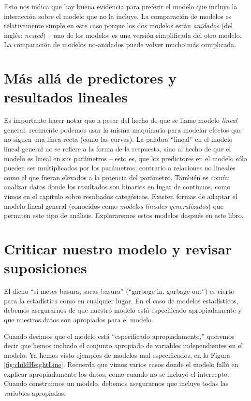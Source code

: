 \documentclass[
  12pt,
]{book}
\theoremstyle{definition}
\theoremstyle{definition}
\theoremstyle{definition}
\theoremstyle{remark}
\begin{document}
Esto nos indica que hay buena evidencia para preferir el modelo que incluye la interacción sobre el modelo que no la incluye. La comparación de modelos es relativamente simple en este caso porque los dos modelos están \emph{anidados} (del inglés: \emph{nested}) -- uno de los modelos es una versión simplificada del otro modelo. La comparación de modelos no-anidados puede volver mucho más complicada.

\hypertarget{muxe1s-alluxe1-de-predictores-y-resultados-lineales}{%
\section{Más allá de predictores y resultados lineales}\label{muxe1s-alluxe1-de-predictores-y-resultados-lineales}}

Es importante hacer notar que a pesar del hecho de que se llame modelo \emph{lineal} general, realmente podemos usar la misma maquinaria para modelar efectos que no siguen una línea recta (como las curvas). La palabra ``lineal'' en el modelo lineal general no se refiere a la forma de la respuesta, sino al hecho de que el modelo es lineal en sus parámetros -- esto es, que los predictores en el modelo sólo pueden ser multiplicados por los parámetros, contrario a relaciones no lineales como el que fueran elevados a la potencia del parámetro. También es común analizar datos donde los resultados son binarios en lugar de continuos, como vimos en el capítulo sobre resultados categóricos. Existen formas de adaptar el modelo lineal general (conocidos como \emph{modelos lineales generalizados}) que permiten este tipo de análisis. Exploraremos estos modelos después en este libro.

\hypertarget{model-criticism}{%
\section{Criticar nuestro modelo y revisar suposiciones}\label{model-criticism}}

El dicho ``si metes basura, sacas basura'' (``garbage in, garbage out'') es cierto para la estadística como en cualquier lugar. En el caso de modelos estadísticos, debemos asegurarnos de que nuestro modelo está especificado apropiadamente y que nuestros datos son apropiados para el modelo.

Cuando decimos que el modelo está ``especificado apropiadamente,'' queremos decir que hemos incluido el conjunto apropiado de variables independientes en el modelo. Ya hemos visto ejemplos de modelos mal especificados, en la Figura \ref{fig:childHeightLine}. Recuerda que vimos varios casos donde el modelo falló en explicar apropiadamente los datos, como cuando no se incluyó el intercepto. Cuando construimos un modelo, debemos asegurarnos que incluye todas las variables apropiadas.
\end{document}
